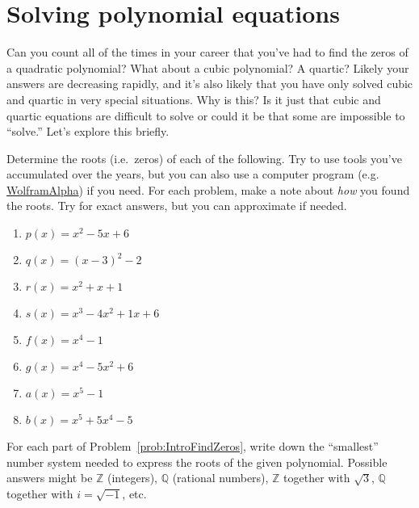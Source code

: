 \chapter{Solving polynomial equations}
\label{chapter:PolyEquations}
\thispagestyle{empty}



Can you count all of the times in your career that you've had to find the zeros of a quadratic polynomial? What about a cubic polynomial? A quartic? Likely your answers are decreasing rapidly, and it's also likely that you have only solved cubic and quartic in very special situations. Why is this? Is it just that cubic and quartic equations are difficult to solve or could it be that some are impossible to ``solve.'' Let's explore this briefly.

\begin{problem}\label{prob:IntroFindZeros}
Determine the roots (i.e.\ zeros) of each of the following. Try to use tools you've accumulated over the years, but you can also use a computer program (e.g. \href{https://www.wolframalpha.com}{WolframAlpha}) if you need. For each problem, make a note about \emph{how} you found the roots. Try for exact answers, but you can approximate if needed.
\begin{multicols}{2}
\begin{enumerate}
\item $p(x) = x^2 - 5x + 6$
\item $q(x) = (x-3)^2 - 2$
\item $r(x) = x^2 + x + 1$
\item $s(x) = x^3 - 4x^2 + 1x + 6$ %
\item $f(x) = x^4 - 1$
\item $g(x) = x^4 - 5x^2 + 6$
\item $a(x) = x^5 - 1$
\item $b(x) = x^5 +5 x^4-5$
\end{enumerate}
\end{multicols}
\end{problem}

\begin{problem}\label{prob:IntroFindZerosWhere}
For each part of Problem~\ref{prob:IntroFindZeros}, write down the ``smallest'' number system needed to express the roots of the given polynomial. Possible answers might be $\mathbb{Z}$ (integers), $\mathbb{Q}$ (rational numbers), $\mathbb{Z}$ together with $\sqrt{3}$, $\mathbb{Q}$ together with $i=\sqrt{-1}$, etc.
\end{problem}

